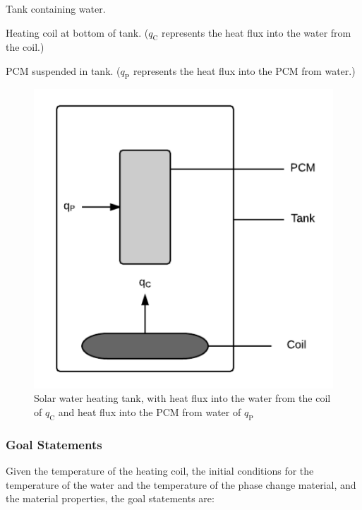 \documentclass[12pt]{article}
\begin{document}
\begin{description}[font=\normalfont]
\item[PS1:]{Tank containing water.}
\item[PS2:]{Heating coil at bottom of tank. (${q_{\text{C}}}$ represents the heat flux into the water from the coil.)}
\item[PS3:]{PCM suspended in tank. (${q_{\text{P}}}$ represents the heat flux into the PCM from water.)}
\end{description}
\begin{figure}[H]
\begin{center}
\includegraphics[width=\textwidth]{../../../../datafiles/swhs/Tank.png}
\caption{Solar water heating tank, with heat flux into the water from the coil of ${q_{\text{C}}}$ and heat flux into the PCM from water of ${q_{\text{P}}}$}
\label{Figure:Tank}
\end{center}
\end{figure}
\subsubsection{Goal Statements}
\label{Sec:GoalStmt}
Given the temperature of the heating coil, the initial conditions for the temperature of the water and the temperature of the phase change material, and the material properties, the goal statements are:
\end{document}
